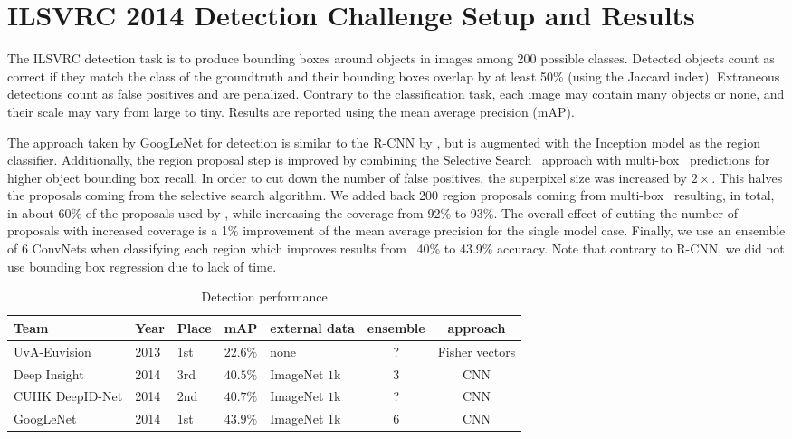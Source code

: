 \section{ILSVRC 2014 Detection Challenge Setup and Results}

The ILSVRC detection task is to produce bounding boxes around objects in images among 200 possible classes. Detected objects count as correct if they match the class of the groundtruth and their bounding boxes overlap by at least 50\% (using the Jaccard index). Extraneous detections count as false positives and are penalized. Contrary to the classification task, each image may contain many objects or none, and their scale may vary from large to tiny. Results are reported using the mean average precision (mAP).

The approach taken by GoogLeNet for detection is similar to the R-CNN by \cite{girshick2014rich}, but is augmented with the Inception model as the region classifier. Additionally, the region proposal step is improved by combining the Selective Search~\cite{sande2011search} approach with multi-box~\cite{erhan2014scalable} predictions for higher object bounding box recall. In order to cut down the number of false positives, the superpixel size was increased by $2\times$. This halves the proposals coming from the selective search algorithm. We added back 200 region proposals coming from multi-box~\cite{erhan2014scalable} resulting, in total, in about 60\% of the proposals used by \cite{girshick2014rich}, while increasing the coverage from 92\% to 93\%. The overall effect of cutting the number of proposals with increased coverage is a 1\% improvement of the mean average precision for the single model case. Finally, we use an ensemble of 6 ConvNets when classifying each region which improves results from ~40\% to 43.9\% accuracy. Note that contrary to R-CNN, we did not use bounding box regression due to lack of time.

\begin{table}
\centering
\begin{tabular}[H]{|l||l|l|l|l|c|c|}
\hline
{\bf Team} & {\bf Year} & {\bf Place} & {\bf mAP} & {\bf external data} & {\bf ensemble} & {\bf approach} \\
\hline
UvA-Euvision & 2013 & 1st & $22.6\%$ & none & ? & Fisher vectors \\
\hline
Deep Insight & 2014 & 3rd & $40.5\%$ & ImageNet $1$k & 3 & CNN \\
\hline
CUHK DeepID-Net & 2014 & 2nd & $40.7\%$ & ImageNet $1$k & ? & CNN \\
\hline
GoogLeNet & 2014 & 1st & $43.9\%$ & ImageNet $1$k & 6 & CNN\\
\hline
\end{tabular}
\caption{Detection performance}
\label{detfinal}
\end{table}

